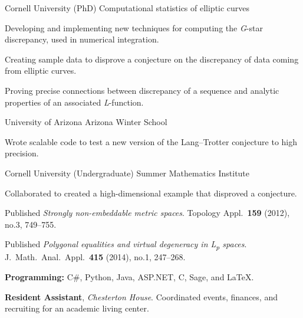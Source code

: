 \documentclass[11pt, letterpaper]{awesome-cv}
\begin{document}

\begin{cventries}

\cventry
	{Cornell University (PhD)}
	{Computational statistics of elliptic curves}
	{}
	{}
	{
		\begin{cvitems}
			\item{Developing and implementing new techniques for computing the \emph{G}-star discrepancy, used in numerical integration.}
			\item{Creating sample data to disprove a conjecture on the discrepancy of data coming from elliptic curves.}
			\item{Proving precise connections between discrepancy of a sequence and analytic properties of an associated \emph{L}-function.}
		\end{cvitems}
	}
		
\cventry
	{University of Arizona}
	{Arizona Winter School}
	{}
	{}
	{
		\begin{cvitems}
			\item{Wrote scalable code to test a new version of the Lang--Trotter conjecture to high precision.}
		\end{cvitems}
	}
	
\cventry
	{Cornell University (Undergraduate)}
	{Summer Mathematics Institute}
	{}
	{}
	{
		\begin{cvitems}
			\item{Collaborated to created a high-dimensional example that disproved a conjecture.}
			\item{Published \emph{Strongly non-embeddable metric spaces}. Topology Appl.~\textbf{159} (2012), no.3, 749--755.}
			\item{Published \emph{Polygonal equalities and virtual degeneracy in L\textsubscript{p} spaces}. J.~Math.~Anal.~Appl.~\textbf{415} (2014), no.1, 247--268.}
		\end{cvitems}
	}
	
\end{cventries}








\begin{cvparagraph}

\textbf{Programming:} C\#, Python, Java, ASP.NET, C, Sage, and \LaTeX.
\end{cvparagraph}






\begin{cvparagraph}

\textbf{Resident Assistant}, \emph{Chesterton House}. Coordinated events, finances, and recruiting for an academic living center.
\end{cvparagraph}
\end{document}
